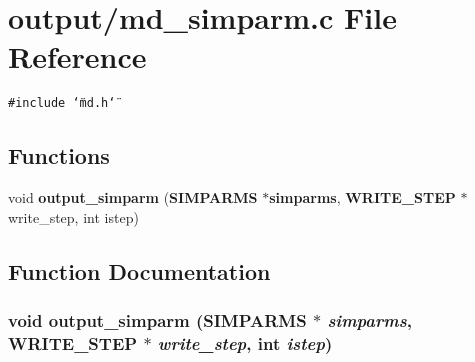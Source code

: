\section{output/md\_\-simparm.c File Reference}
\label{md__simparm_8c}
{\tt \#include \char`\"{}md.h\char`\"{}}\par
\subsection*{Functions}
\begin{CompactItemize}
\item 
void {\bf output\_\-simparm} ({\bf SIMPARMS} $\ast${\bf simparms}, {\bf WRITE\_\-STEP} $\ast$write\_\-step, int istep)
\end{CompactItemize}


\subsection{Function Documentation}
\subsubsection{\setlength{\rightskip}{0pt plus 5cm}void output\_\-simparm ({\bf SIMPARMS} $\ast$ {\em simparms}, {\bf WRITE\_\-STEP} $\ast$ {\em write\_\-step}, int {\em istep})}\label{md__simparm_8c_9bb59da359d595c817afaa1364ee0a88}



